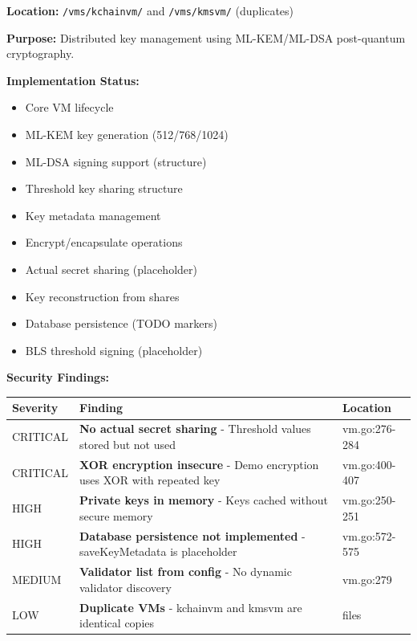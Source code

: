 \documentclass[
]{article}
\newcounter{none} %
\providecommand{\tightlist}{%
  \setlength{\itemsep}{0pt}\setlength{\parskip}{0pt}}
\begin{document}
\textbf{Location:} \texttt{/vms/kchainvm/} and \texttt{/vms/kmsvm/}
(duplicates)

\textbf{Purpose:} Distributed key management using ML-KEM/ML-DSA
post-quantum cryptography.

\textbf{Implementation Status:}

\begin{itemize}
\tightlist
\item[$\boxtimes$]
  Core VM lifecycle
\item[$\boxtimes$]
  ML-KEM key generation (512/768/1024)
\item[$\boxtimes$]
  ML-DSA signing support (structure)
\item[$\boxtimes$]
  Threshold key sharing structure
\item[$\boxtimes$]
  Key metadata management
\item[$\boxtimes$]
  Encrypt/encapsulate operations
\item[$\square$]
  Actual secret sharing (placeholder)
\item[$\square$]
  Key reconstruction from shares
\item[$\square$]
  Database persistence (TODO markers)
\item[$\square$]
  BLS threshold signing (placeholder)
\end{itemize}

\textbf{Security Findings:}

{\def\LTcaptype{none} %
\begin{longtable}[]{@{}lll@{}}
\toprule\noalign{}
Severity & Finding & Location \\
\midrule\noalign{}
\endhead
\bottomrule\noalign{}
\endlastfoot
CRITICAL & \textbf{No actual secret sharing} - Threshold values stored
but not used & vm.go:276-284 \\
CRITICAL & \textbf{XOR encryption insecure} - Demo encryption uses XOR
with repeated key & vm.go:400-407 \\
HIGH & \textbf{Private keys in memory} - Keys cached without secure
memory & vm.go:250-251 \\
HIGH & \textbf{Database persistence not implemented} - saveKeyMetadata
is placeholder & vm.go:572-575 \\
MEDIUM & \textbf{Validator list from config} - No dynamic validator
discovery & vm.go:279 \\
LOW & \textbf{Duplicate VMs} - kchainvm and kmsvm are identical copies &
files \\
\end{longtable}
}
\end{document}
